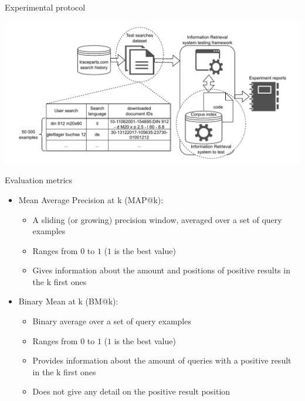 \begin{frame}{Experimental protocol}

        \vspace{-1em}
        \begin{center}
            \includegraphics[scale=0.55]{images/tp-search-expe-setting.pdf} 
        \end{center}

\end{frame}

\begin{frame}{Evaluation metrics}

    \begin{itemize}
        \item Mean Average Precision at k (MAP@k): 
        \begin{itemize}
            \item A sliding (or growing) precision window, averaged over a set of query examples
            \item Ranges from $0$ to $1$ ($1$ is the best value)
            \item Gives information about the amount and positions of positive results in the k first ones
        \end{itemize}
        \item Binary Mean at k (BM@k):
        \begin{itemize}
            \item Binary average over a set of query examples
            \item Ranges from $0$ to $1$ ($1$ is the best value)
            \item Provides information about the amount of queries with a positive result in the k first ones
            \item Does not give any detail on the positive result position
        \end{itemize}
    \end{itemize}

\end{frame}

